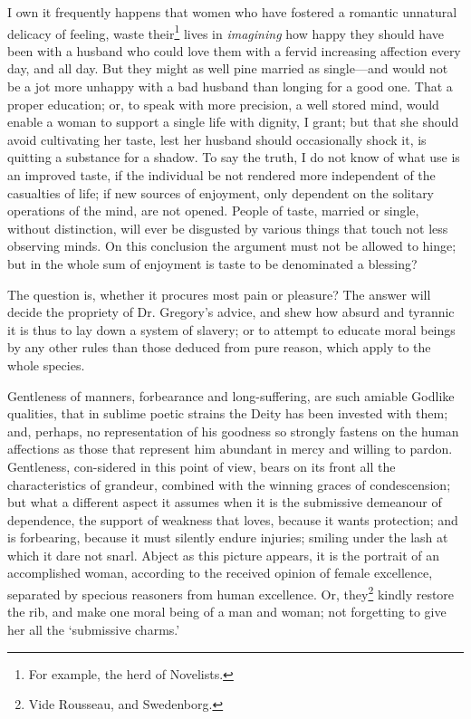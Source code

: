 I own it frequently happens that women who have fostered a romantic
unnatural delicacy of feeling, waste their\footnote{For example, the
herd of Novelists.} lives in \textit{imagining} how happy they should
have been with a husband who could love them with a fervid
increasing affection every day, and all day. But they might as well
pine married as single---and would not be a jot more unhappy with a
bad husband than longing for a good one. That a proper education; or,
to speak with more precision, a well stored mind, would enable a woman
to support a single life with dignity, I grant; but that she should
avoid cultivating her taste, lest her husband should occasionally
shock it, is quitting a substance for a shadow. To say the truth, I do
not know of what use is an improved taste, if  the individual
be not rendered more independent of the casualties of life; if new
sources of enjoyment, only dependent on the solitary operations of the
mind, are not opened. People of taste, married or single, without
distinction, will ever be disgusted by various things that touch not
less observing minds. On this conclusion the argument must not be
allowed to hinge; but in the whole sum of enjoyment is taste to be
denominated a blessing?

The question is, whether it procures most pain or pleasure? The answer
will decide the propriety of Dr. Gregory's advice, and shew how absurd
and tyrannic it is thus to lay down a system of slavery; or to attempt
to educate moral beings by any other rules than those deduced from
pure reason, which apply to the whole species.

Gentleness of manners, forbearance and long-suffering, are such
amiable Godlike qualities, that in sublime poetic strains the Deity
has been invested with them; and, perhaps, no representation of his
goodness so strongly fastens on the human affections as those that
represent him abundant in mercy and willing to pardon. Gentleness,
con-sidered in this point of view, bears on its front all the
characteristics of grandeur, combined with the winning graces of
condescension; but what a different aspect it assumes when it is the
submissive demeanour of dependence, the support of weakness that
loves, because it wants protection; and is forbearing, because it must
silently endure injuries; smiling under the lash at which it dare not
snarl. Abject as this picture appears, it is the portrait of an
accomplished woman, according to the received opinion of female
excellence, separated by specious reasoners from human excellence. Or,
they\footnote{Vide Rousseau, and Swedenborg.} kindly restore the rib,
and make one moral being of a man and woman; not forgetting to give
her all the `submissive charms.'

